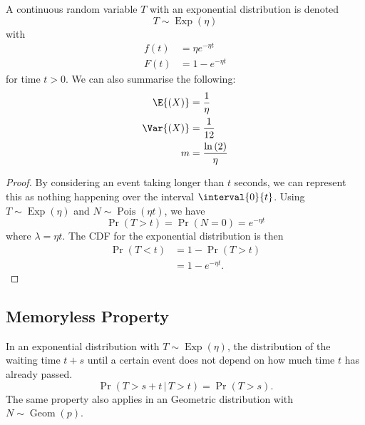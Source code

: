 \documentclass{article}
\begin{document}
\begin{multicols}{3}
    A continuous random variable \(T\) with an exponential distribution is denoted
    \begin{equation*}
        T \sim \operatorname{Exp}{\left( \eta \right)}
    \end{equation*}
    with
    \begin{align*}
        f\left( t \right) & = \eta e^{-\eta t} \\
        F\left( t \right) & = 1 - e^{-\eta t}
    \end{align*}
    for time \(t > 0\).
    We can also summarise the following:
    \begin{align*}
        \E{\left( X \right)}   & = \frac{1}{\eta}                     \\
        \Var{\left( X \right)} & = \frac{1}{12}                       \\
        m                      & = \frac{\ln{\left( 2 \right)}}{\eta}
    \end{align*}
    \begin{proof}
        By considering an event taking longer than \(t\) seconds, we can represent this as nothing happening
        over the interval \(\interval{0}{t}\). Using \(T \sim \operatorname{Exp}{\left( \eta \right)}\) and
        \(N \sim \operatorname{Pois}{\left( \eta t \right)}\), we have
        \begin{equation*}
            \Pr{\left( T > t \right)} = \Pr{\left( N = 0 \right)} = e^{-\eta t}
        \end{equation*}
        where \(\lambda = \eta t\). The CDF for the exponential distribution is then
        \begin{align*}
            \Pr{\left( T < t \right)} & = 1 - \Pr{\left( T > t \right)} \\
                                      & = 1 - e^{-\eta t}.
        \end{align*}
    \end{proof}
    \subsection{Memoryless Property}
    In an exponential distribution with \(T \sim \operatorname{Exp}{\left( \eta \right)}\),
    the distribution of the waiting time \(t + s\) until a certain event does not depend on
    how much time \(t\) has already passed.
    \begin{equation*}
        \Pr{\left( T > s + t \,\vert\, T > t \right)} = \Pr{\left( T > s \right)}.
    \end{equation*}
    The same property also applies in an Geometric distribution with \(N \sim \operatorname{Geom}{\left( p \right)}\).

\end{multicols}
\end{document}
